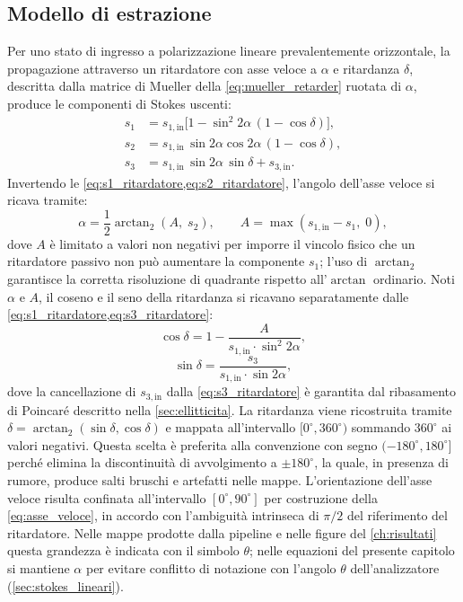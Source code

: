 \subsection{Modello di estrazione}
\label{subsec:modello_retardance}

Per uno stato di ingresso a polarizzazione lineare prevalentemente orizzontale, la propagazione attraverso un ritardatore con asse veloce a $\alpha$ e ritardanza $\delta$, descritta dalla matrice di Mueller della \cref{eq:mueller_retarder} ruotata di $\alpha$, produce le componenti di Stokes uscenti:
\begin{align}
    s_1 &= s_{1,\mathrm{in}}\bigl[1 - \sin^2\!2\alpha\,(1-\cos\delta)\bigr], \label{eq:s1_ritardatore}\\
    s_2 &= s_{1,\mathrm{in}}\,\sin 2\alpha\cos 2\alpha\,(1-\cos\delta), \label{eq:s2_ritardatore}\\
    s_3 &= s_{1,\mathrm{in}}\,\sin 2\alpha\,\sin\delta + s_{3,\mathrm{in}}. \label{eq:s3_ritardatore}
\end{align}
Invertendo le \cref{eq:s1_ritardatore,eq:s2_ritardatore}, l'angolo dell'asse veloce si ricava tramite:
\begin{equation}
    \alpha = \frac{1}{2} \arctan_2\!\left(A,\; s_2\right), \qquad A = \max(s_{1,\mathrm{in}} - s_1,\; 0),
    \label{eq:asse_veloce}
\end{equation}
dove $A$ è limitato a valori non negativi per imporre il vincolo fisico che un ritardatore passivo non può aumentare la componente $s_1$; l'uso di $\arctan_2$ garantisce la corretta risoluzione di quadrante rispetto all'$\arctan$ ordinario. Noti $\alpha$ e $A$, il coseno e il seno della ritardanza si ricavano separatamente dalle \cref{eq:s1_ritardatore,eq:s3_ritardatore}:
\begin{equation}
    \cos\delta = 1 - \frac{A}{s_{1,\mathrm{in}} \cdot \sin^2\!2\alpha},
    \label{eq:cos_delta}
\end{equation}
\begin{equation}
    \sin\delta = \frac{s_{3}}{s_{1,\mathrm{in}} \cdot \sin 2\alpha},
    \label{eq:sin_delta}
\end{equation}
dove la cancellazione di $s_{3,\mathrm{in}}$ dalla \cref{eq:s3_ritardatore} è garantita dal ribasamento di Poincaré descritto nella \cref{sec:ellitticita}. La ritardanza viene ricostruita tramite $\delta = \arctan_2(\sin\delta,\cos\delta)$ e mappata all'intervallo $[0^\circ, 360^\circ)$ sommando $360^\circ$ ai valori negativi. Questa scelta è preferita alla convenzione con segno $(-180^\circ, 180^\circ]$ perché elimina la discontinuità di avvolgimento a $\pm180^\circ$, la quale, in presenza di rumore, produce salti bruschi e artefatti nelle mappe. L'orientazione dell'asse veloce risulta confinata all'intervallo $[0^\circ, 90^\circ]$ per costruzione della \cref{eq:asse_veloce}, in accordo con l'ambiguità intrinseca di $\pi/2$ del riferimento del ritardatore. Nelle mappe prodotte dalla pipeline e nelle figure del \cref{ch:risultati} questa grandezza è indicata con il simbolo $\theta$; nelle equazioni del presente capitolo si mantiene $\alpha$ per evitare conflitto di notazione con l'angolo $\theta$ dell'analizzatore (\cref{sec:stokes_lineari}).

